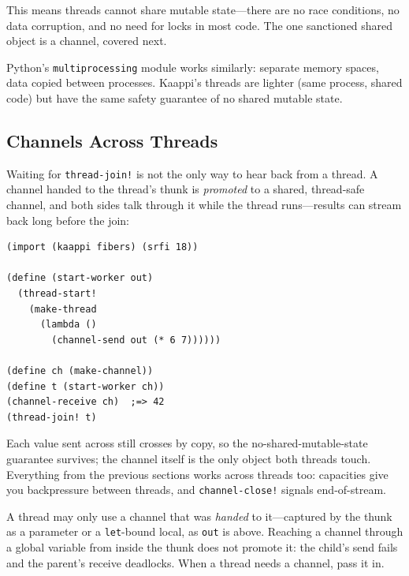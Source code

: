 This means threads cannot share mutable state---there are no race conditions, no data corruption, and no need for locks in most code. The one sanctioned shared object is a channel, covered next.

\begin{note}
Python's \texttt{multiprocessing} module works similarly: separate memory spaces, data copied between processes. Kaappi's threads are lighter (same process, shared code) but have the same safety guarantee of no shared mutable state.
\end{note}

\subsection{Channels Across Threads}

Waiting for \texttt{thread-join!} is not the only way to hear back from a thread. A channel handed to the thread's thunk is \emph{promoted} to a shared, thread-safe channel, and both sides talk through it while the thread runs---results can stream back long before the join:

\begin{lstlisting}
(import (kaappi fibers) (srfi 18))

(define (start-worker out)
  (thread-start!
    (make-thread
      (lambda ()
        (channel-send out (* 6 7))))))

(define ch (make-channel))
(define t (start-worker ch))
(channel-receive ch)  ;=> 42
(thread-join! t)
\end{lstlisting}

Each value sent across still crosses by copy, so the no-shared-mutable-state guarantee survives; the channel itself is the only object both threads touch. Everything from the previous sections works across threads too: capacities give you backpressure between threads, and \texttt{channel-close!} signals end-of-stream.

\begin{warning}
A thread may only use a channel that was \emph{handed} to it---captured by the thunk as a parameter or a \texttt{let}-bound local, as \texttt{out} is above. Reaching a channel through a global variable from inside the thunk does not promote it: the child's send fails and the parent's receive deadlocks. When a thread needs a channel, pass it in.
\end{warning}


